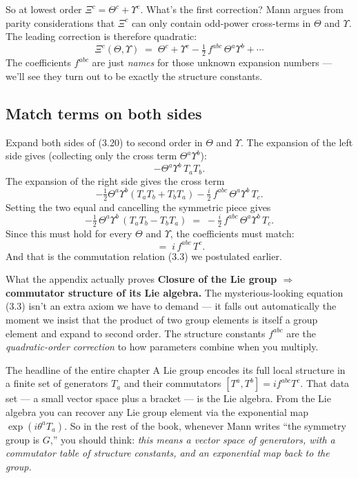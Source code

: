 \documentclass[11pt]{article}
\begin{document}
So at lowest order $\Xi^c = \Theta^c + \Upsilon^c$. What's the first
correction? Mann argues from parity considerations that $\Xi^c$ can
only contain odd-power cross-terms in $\Theta$ and $\Upsilon$. The
leading correction is therefore quadratic:
\begin{equation}
  \Xi^c(\Theta, \Upsilon) \;=\; \Theta^c + \Upsilon^c
    - \tfrac{1}{2}\, f^{abc}\, \Theta^a \Upsilon^b + \cdots
  \tag{3.21}
\end{equation}
The coefficients $f^{abc}$ are just \emph{names} for those unknown
expansion numbers --- we'll see they turn out to be exactly the
structure constants.

\subsection*{Match terms on both sides}

Expand both sides of (3.20) to second order in $\Theta$ and $\Upsilon$.
The expansion of the left side gives (collecting only the cross term
$\Theta^a \Upsilon^b$):
\[
  -\Theta^a \Upsilon^b\, T_a T_b.
\]
The expansion of the right side gives the cross term
\[
  -\tfrac{1}{2}\Theta^a \Upsilon^b (T_a T_b + T_b T_a)
    - \tfrac{i}{2}\, f^{abc}\, \Theta^a \Upsilon^b\, T_c.
\]
Setting the two equal and cancelling the symmetric piece gives
\[
  -\tfrac{1}{2}\,\Theta^a \Upsilon^b\, (T_a T_b - T_b T_a)
  \;=\; -\tfrac{i}{2}\, f^{abc}\, \Theta^a \Upsilon^b\, T_c.
\]
Since this must hold for every $\Theta$ and $\Upsilon$, the coefficients
must match:
\begin{equation}
  [T^a, T^b] \;=\; i\, f^{abc}\, T^c.
  \tag{3.24}
\end{equation}
And that is the commutation relation (3.3) we postulated earlier.

\begin{keybox}{What the appendix actually proves}
\textbf{Closure of the Lie group $\Rightarrow$ commutator structure of
its Lie algebra.} The mysterious-looking equation (3.3) isn't an extra
axiom we have to demand --- it falls out automatically the moment we
insist that the product of two group elements is itself a group element
and expand to second order. The structure constants $f^{abc}$ are the
\emph{quadratic-order correction} to how parameters combine when you
multiply.
\end{keybox}

\begin{intuitionbox}{The headline of the entire chapter}
A Lie group encodes its full local structure in a finite set of
generators $T_a$ and their commutators $[T^a, T^b] = i f^{abc} T^c$.
That data set --- a small vector space plus a bracket --- is the Lie
algebra. From the Lie algebra you can recover any Lie group element via
the exponential map $\exp(i\theta^a T_a)$. So in the rest of the book,
whenever Mann writes ``the symmetry group is $G$,'' you should think:
\emph{this means a vector space of generators, with a commutator table
of structure constants, and an exponential map back to the group.}
\end{intuitionbox}
\end{document}
